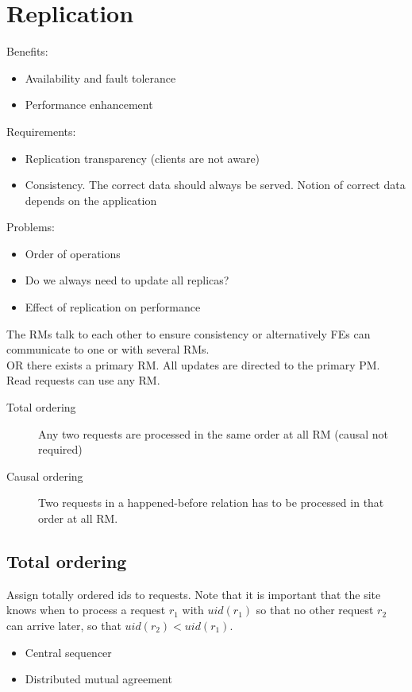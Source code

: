 \documentclass[a4paper]{article}
\begin{document}
\section{Replication}
Benefits:
\begin{itemize}
		\item Availability and fault tolerance
		\item Performance enhancement
\end{itemize}
Requirements:
\begin{itemize}
		\item Replication transparency (clients are not aware)
		\item Consistency. The correct data should always be served. Notion of
				correct data depends on the application
\end{itemize}
Problems:
\begin{itemize}
		\item Order of operations
		\item Do we always need to update all replicas?
		\item Effect of replication on performance
\end{itemize}
The RMs talk to each other to ensure consistency or alternatively FEs can
communicate to one or with several RMs.\\
OR there exists a primary RM. All updates are directed to the primary PM. Read
requests can use any RM.
\begin{description}
		\item[Total ordering] Any two requests are processed in the same order
				at all RM (causal not required)
		\item[Causal ordering] Two requests in a happened-before relation has to
				be processed in that order at all RM.
\end{description}

\subsection{Total ordering}
Assign totally ordered ids to requests. Note that it is important that the site
knows when to process a request $r_1$ with $uid(r_1)$ so that no other request
$r_2$ can arrive later, so that $uid(r_2)<uid(r_1)$.
\begin{itemize}
		\item Central sequencer
		\item Distributed mutual agreement
\end{itemize}
\end{document}
